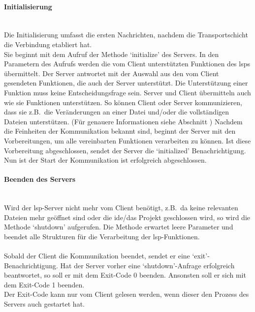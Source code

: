 \documentclass[./einleitung.tex]{subfiles}
\begin{document}
    \paragraph{Initialisierung}\mbox{}\\
    Die Initialisierung umfasst die ersten Nachrichten, nachdem die Transportschicht die Verbindung etabliert hat. \\
    Sie beginnt mit dem Aufruf der Methode `initialize' des Servers.
    In den Parametern des Aufrufs werden die vom Client unterstützten Funktionen des \acrshort{lsp}s übermittelt.
    Der Server antwortet mit der Auswahl aus den vom Client gesendeten Funktionen, die auch der Server unterstützt.
    Die Unterstützung einer Funktion muss keine Entscheidungsfrage sein.
    Server und Client übermitteln auch wie sie Funktionen unterstützen.
    So können Client oder Server kommunizieren, dass sie z.B.\ die Veränderungen an einer Datei und/oder die vollständigen Dateien unterstützen.
    (Für genauere Informationen siehe Abschnitt )
    \newline
    \newline
    Nachdem die Feinheiten der Kommunikation bekannt sind, beginnt der Server mit den Vorbereitungen, um alle vereinbarten Funktionen verarbeiten zu können.
    Ist diese Vorbereitung abgeschlossen, sendet der Server die `initialized' Benachrichtigung.
    Nun ist der Start der Kommunikation ist erfolgreich abgeschlossen.


    \paragraph{Beenden des Servers}\mbox{}\\
    Wird der \acrshort{lsp}-Server nicht mehr vom Client benötigt, z.B.\ da keine relevanten Dateien mehr geöffnet sind oder die \acrshort{ide}/das Projekt geschlossen wird, so wird die Methode `shutdown' aufgerufen.
    Die Methode erwartet leere Parameter und beendet alle Strukturen für die Verarbeitung der \acrshort{lsp}-Funktionen.
    \\\\
    Sobald der Client die Kommunikation beendet, sendet er eine `exit'-Benachrichtigung.
    Hat der Server vorher eine `shutdown'-Anfrage erfolgreich beantwortet, so soll er mit dem Exit-Code 0 beenden.
    Ansonsten soll er sich mit dem Exit-Code 1 beenden.\\
    Der Exit-Code kann nur vom Client gelesen werden, wenn dieser den Prozess des Servers auch gestartet hat.
\end{document}

